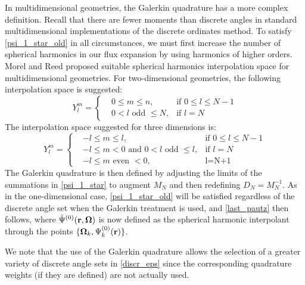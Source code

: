 In multidimensional geometries, the Galerkin quadrature has a more complex
definition. Recall that there are fewer moments than discrete angles in
standard multidimensional implementations of the discrete ordinates method.
To satisfy \cref{psi_1_star_old} in all circumstances, we must first
increase the number of spherical harmonics in our flux expansion by using
harmonics of higher orders. Morel\cite{galerkin_morel} and Reed\cite{reed}
proposed suitable spherical harmonics interpolation space for multidimensional
geometries. For two-dimensional geometries, the following interpolation space
is suggested:
\begin{equation}
Y_l^m = \left\{
\begin{aligned}
&0\leq m \leq n, & \textrm{if }0\leq l\leq N-1 \\
&0< l\textrm{ odd }\leq N, & \textrm{if }l=N
\end{aligned}
\right.
\end{equation}
The interpolation space suggested for three dimensions is:
\begin{equation}
Y_l^m = \left\{
\begin{aligned}
&-l\leq m \leq l, & \textrm{if }0\leq l \leq N-1\\
&-l\leq m <0 \textrm{ and } 0<l\textrm{ odd }\leq l, & \textrm{if }l=N\\
&-l\leq m\textrm{ even }<0,& \textrm{l=N+1}
\end{aligned}
\right.
\end{equation}
The Galerkin quadrature is then defined by adjusting the limits of the
summations in \cref{psi_1_star} to augment $M_N$ and then redefining
$D_N=M_N^{-1}$. As in the one-dimensional case, \cref{psi_1_star_old} will be 
satisfied regardless of the discrete angle set when the Galerkin treatment is 
used, and \cref{last_pautz} then follows, where $\tilde{\Psi}^{(0)}(\mathbf{r},\boldsymbol{\Omega})$ 
is now defined as the spherical harmonic interpolant through the points 
$\{\boldsymbol{\Omega}_k,\Psi_k^{(0)}(\mathbf{r})\}$.

We note that the use of the Galerkin quadrature allows the selection of a
greater variety of discrete angle sets in \cref{discr_eps} since the
corresponding quadrature weights (if they are defined) are not actually used.

